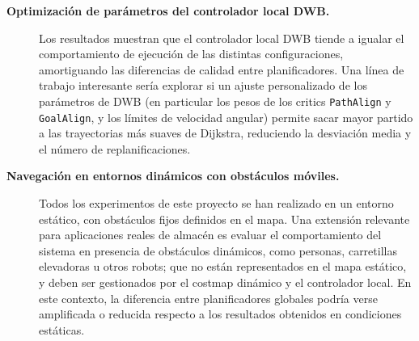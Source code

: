 \begin{description}
    \item[\textbf{Optimización de parámetros del controlador local DWB.}] \hfill\break
    Los resultados muestran que el controlador local DWB tiende a igualar el comportamiento de ejecución de las distintas configuraciones, amortiguando las diferencias de calidad entre planificadores. Una línea de trabajo interesante sería explorar si un ajuste personalizado de los parámetros de DWB (en particular los pesos de los critics \texttt{PathAlign} y \texttt{GoalAlign}, y los límites de velocidad angular) permite sacar mayor partido a las trayectorias más suaves de Dijkstra, reduciendo la desviación media y el número de replanificaciones.

    \item[\textbf{Navegación en entornos dinámicos con obstáculos móviles.}] \hfill\break
    Todos los experimentos de este proyecto se han realizado en un entorno estático, con obstáculos fijos definidos en el mapa. Una extensión relevante para aplicaciones reales de almacén es evaluar el comportamiento del sistema en presencia de obstáculos dinámicos, como personas, carretillas elevadoras u otros robots; que no están representados en el mapa estático, y deben ser gestionados por el costmap dinámico y el controlador local. En este contexto, la diferencia entre planificadores globales podría verse amplificada o reducida respecto a los resultados obtenidos en condiciones estáticas.

\end{description}
